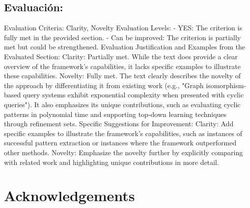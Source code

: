 \documentclass{article}%
\begin{document}
\subsection{Evaluación:}%
\label{subsec:Evaluacin}%
Evaluation Criteria: Clarity, Novelty\newline%
\newline%
Evaluation Levels: \newline%
{-} YES: The criterion is fully met in the provided section.\newline%
{-} Can be improved: The criterion is partially met but could be strengthened.\newline%
\newline%
Evaluation Justification and Examples from the Evaluated Section:\newline%
\newline%
Clarity: Partially met. While the text does provide a clear overview of the framework's capabilities, it lacks specific examples to illustrate these capabilities. \newline%
\newline%
Novelty: Fully met. The text clearly describes the novelty of the approach by differentiating it from existing work (e.g., "Graph isomorphism{-}based query systems exhibit exponential complexity when presented with cyclic queries"). It also emphasizes its unique contributions, such as evaluating cyclic patterns in polynomial time and supporting top{-}down learning techniques through refinement sets.\newline%
\newline%
Specific Suggestions for Improvement:\newline%
\newline%
Clarity: Add specific examples to illustrate the framework's capabilities, such as instances of successful pattern extraction or instances where the framework outperformed other methods.\newline%
\newline%
Novelty: Emphasize the novelty further by explicitly comparing with related work and highlighting unique contributions in more detail.

%
\newpage%
\section*{Acknowledgements}


\vspace{6pt} 
\end{document}

